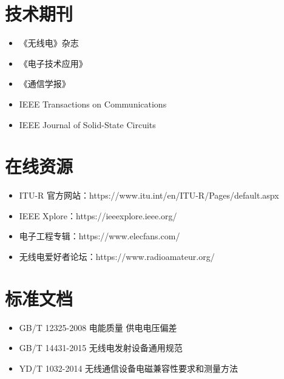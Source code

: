 \section{技术期刊}

\begin{itemize}
    \item 《无线电》杂志
    \item 《电子技术应用》
    \item 《通信学报》
    \item IEEE Transactions on Communications
    \item IEEE Journal of Solid-State Circuits
\end{itemize}

\section{在线资源}

\begin{itemize}
    \item ITU-R 官方网站：https://www.itu.int/en/ITU-R/Pages/default.aspx
    \item IEEE Xplore：https://ieeexplore.ieee.org/
    \item 电子工程专辑：https://www.elecfans.com/
    \item 无线电爱好者论坛：https://www.radioamateur.org/
\end{itemize}

\section{标准文档}

\begin{itemize}
    \item GB/T 12325-2008 电能质量 供电电压偏差
    \item GB/T 14431-2015 无线电发射设备通用规范
    \item YD/T 1032-2014 无线通信设备电磁兼容性要求和测量方法
\end{itemize}